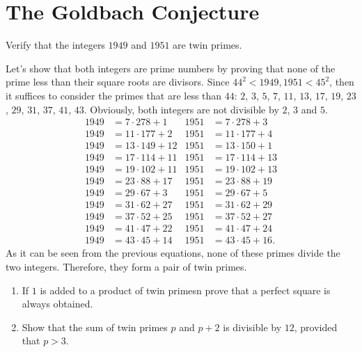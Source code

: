 \section{The Goldbach Conjecture}

\begin{exercise}
    Verify that the integers $1949$ and $1951$ are twin primes. \\
\end{exercise}

\begin{solution}
    Let's show that both integers are prime numbers by proving that none of the prime less than their square roots are divisors. Since $44^2 < 1949, 1951 < 45^2$, then it suffices to consider the primes that are less than $44$: $2$, $3$, $5$, $7$, $11$, $13$, $17$, $19$, $23$, $29$, $31$, $37$, $41$, $43$. Obviously, both integers are not divisible by $2$, $3$ and $5$.
    \begin{align*}
        1949&=7\cdot 278 + 1 & 1951&=7\cdot 278 + 3 \\
        1949&=11\cdot 177 + 2 & 1951&=11\cdot 177 + 4\\
        1949&=13\cdot 149 + 12 & 1951&=13\cdot 150 + 1\\
        1949&=17\cdot 114 + 11 & 1951&=17\cdot 114 + 13\\
        1949&=19\cdot 102 + 11 & 1951&=19\cdot 102 + 13\\
        1949&=23\cdot 88 + 17 & 1951&=23\cdot 88 + 19\\
        1949&=29\cdot 67 + 3 & 1951&=29\cdot 67 + 5\\
        1949&=31\cdot 62 + 27 & 1951&=31\cdot 62 + 29\\
        1949&=37\cdot 52 + 25 & 1951&=37\cdot 52 + 27\\
        1949&=41\cdot 47 + 22 & 1951&=41\cdot 47 + 24\\
        1949&=43\cdot 45 + 14 & 1951&=43\cdot 45 + 16.
    \end{align*}
    As it can be seen from the previous equations, none of these primes divide the two integers. Therefore, they form a pair of twin primes. \\
\end{solution}

\begin{exercise}
    \begin{enumerate}
        \item If $1$ is added to a product of twin primesn prove that a perfect square is always obtained.
        \item Show that the sum of twin primes $p$ and $p+2$ is divisible by $12$, provided that $p > 3$.
    \end{enumerate}
\end{exercise}

